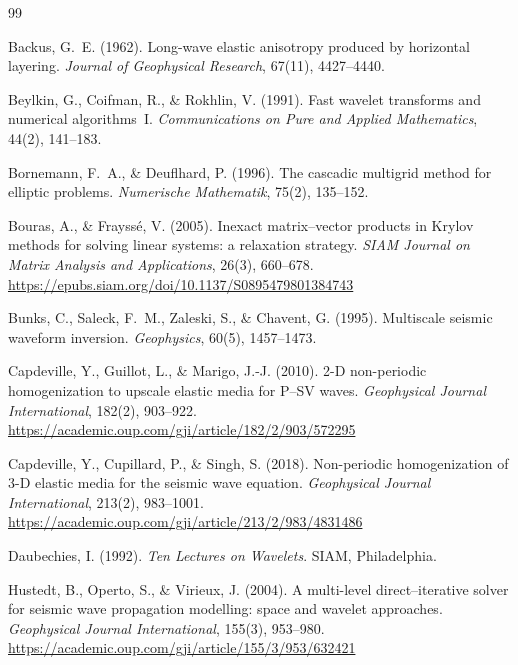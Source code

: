 \documentclass[11pt,a4paper]{article}
\begin{document}
\begin{thebibliography}{99}

Backus, G.~E. (1962).
Long-wave elastic anisotropy produced by horizontal layering.
\emph{Journal of Geophysical Research}, 67(11), 4427--4440.

Beylkin, G., Coifman, R., \& Rokhlin, V. (1991).
Fast wavelet transforms and numerical algorithms~I.
\emph{Communications on Pure and Applied Mathematics}, 44(2), 141--183.

Bornemann, F.~A., \& Deuflhard, P. (1996).
The cascadic multigrid method for elliptic problems.
\emph{Numerische Mathematik}, 75(2), 135--152.

Bouras, A., \& Frayss\'e, V. (2005).
Inexact matrix--vector products in Krylov methods for solving linear systems:
a relaxation strategy.
\emph{SIAM Journal on Matrix Analysis and Applications}, 26(3), 660--678.
\url{https://epubs.siam.org/doi/10.1137/S0895479801384743}

Bunks, C., Saleck, F.~M., Zaleski, S., \& Chavent, G. (1995).
Multiscale seismic waveform inversion.
\emph{Geophysics}, 60(5), 1457--1473.

Capdeville, Y., Guillot, L., \& Marigo, J.-J. (2010).
2-D non-periodic homogenization to upscale elastic media for P--SV waves.
\emph{Geophysical Journal International}, 182(2), 903--922.
\url{https://academic.oup.com/gji/article/182/2/903/572295}

Capdeville, Y., Cupillard, P., \& Singh, S. (2018).
Non-periodic homogenization of 3-D elastic media for the seismic wave equation.
\emph{Geophysical Journal International}, 213(2), 983--1001.
\url{https://academic.oup.com/gji/article/213/2/983/4831486}

Daubechies, I. (1992).
\emph{Ten Lectures on Wavelets}.
SIAM, Philadelphia.

Hustedt, B., Operto, S., \& Virieux, J. (2004).
A multi-level direct--iterative solver for seismic wave propagation modelling:
space and wavelet approaches.
\emph{Geophysical Journal International}, 155(3), 953--980.
\url{https://academic.oup.com/gji/article/155/3/953/632421}


\end{thebibliography}
\end{document}
